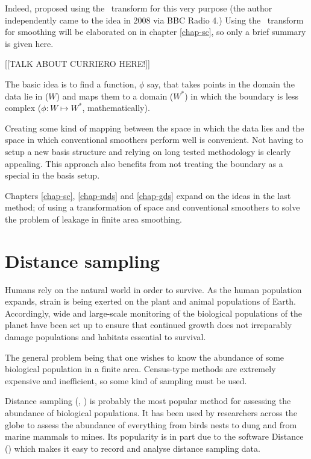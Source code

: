 \begin{enumerate}
Indeed,  proposed using the \sch\ transform for this very purpose (the author independently came to the idea in 2008 via BBC Radio 4.) Using the \sch\ transform for smoothing will be elaborated on in chapter \ref{chap-sc}, so only a brief summary is given here.

[[TALK ABOUT CURRIERO HERE!]]

The basic idea is to find a function, $\phi$ say, that takes points in the domain the data lie in ($W$) and maps them to a domain ($W^*$) in which the boundary is less complex ($\phi : W \mapsto W^*$, mathematically).

Creating some kind of mapping between the space in which the data lies and the space in which conventional smoothers perform well is convenient. Not having to setup a new basis structure and relying on long tested methodology is clearly appealing. This approach also benefits from not treating the boundary as a special in the basis setup.
\end{enumerate}

Chapters \ref{chap-sc}, \ref{chap-mds} and \ref{chap-gds} expand on the ideas in the last method; of using a transformation of space and conventional smoothers to solve the problem of leakage in finite area smoothing.




\section{Distance sampling}
\label{intro-DS}

Humans rely on the natural world in order to survive. As the human population expands, strain is being exerted on the plant and animal populations of Earth. Accordingly, wide and large-scale monitoring of the biological populations of the planet have been set up to ensure that continued growth does not irreparably damage populations and habitats essential to survival.

The general problem being that one wishes to know the abundance of some biological population in a finite area. Census-type methods are extremely expensive and inefficient, so some kind of sampling must be used. 

Distance sampling (\cite{IDS}, \cite{ADS}) is probably the most popular method for assessing the abundance of biological populations. It has been used by researchers across the globe to assess the abundance of everything from birds nests to dung and from marine mammals to mines. Its popularity is in part due to the software Distance (\cite{distance-software}) which makes it easy to record and analyse distance sampling data.

